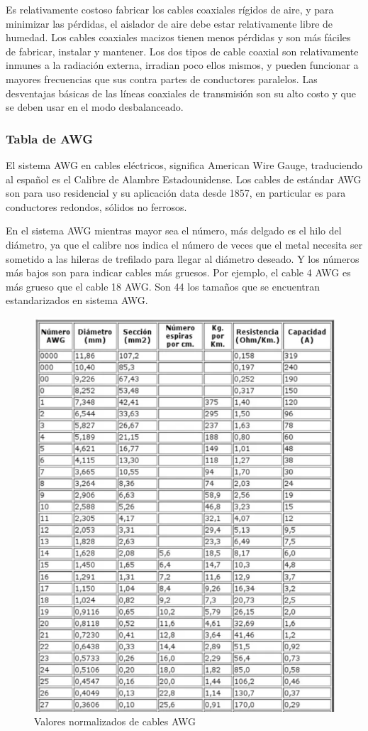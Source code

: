             Es relativamente costoso fabricar los cables coaxiales rígidos de aire, y para minimizar las pérdidas, el aislador de aire debe estar relativamente libre de humedad. Los cables coaxiales macizos tienen menos pérdidas y son más fáciles de fabricar, instalar y mantener. Los dos tipos de cable coaxial son relativamente inmunes a la radiación externa, irradian poco ellos mismos, y pueden funcionar a mayores frecuencias que sus contra partes de conductores paralelos. Las desventajas básicas de las líneas coaxiales de transmisión son su alto costo y que se deben usar en el modo desbalanceado.

        \subsubsection{Tabla de AWG}

            El sistema AWG en cables eléctricos, significa American Wire Gauge, traduciendo al español es el Calibre de Alambre Estadounidense. Los cables de estándar AWG son para uso residencial y su aplicación data desde 1857, en particular es para conductores redondos, sólidos no ferrosos.
            
            En el sistema AWG mientras mayor sea el número, más delgado es el hilo del diámetro, ya que el calibre nos indica el número de veces que el metal necesita ser sometido a las hileras de trefilado para llegar al diámetro deseado. Y los números más bajos son para indicar cables más gruesos. Por ejemplo, el cable 4 AWG es más grueso que el cable 18 AWG. Son 44 los tamaños que se encuentran estandarizados en sistema AWG.

            \begin{figure}[H]
                \centering
                \includegraphics[width=0.5\linewidth]{imagenes/awg.png}
                \caption{Valores normalizados de cables AWG}
                \label{fig:awg}
            \end{figure}

